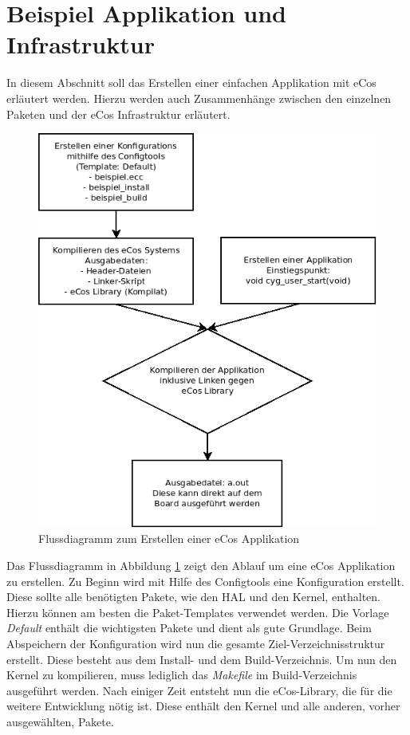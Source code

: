 \documentclass[
  a4paper,					%
  twoside,
  DIV=calc,     				%
  bibliography=totoc,
  cleardoublepage=empty,
  ngerman,     					%
  final       					%
]{scrbook}
\begin{document}
\section{Beispiel Applikation und Infrastruktur}
\label{sec:beispiel_infra}
In diesem Abschnitt soll das Erstellen einer einfachen Applikation mit eCos erläutert werden. Hierzu werden auch Zusammenhänge zwischen den einzelnen Paketen und der eCos Infrastruktur erläutert.


\begin{figure}
\includegraphics[width=12cm]{beispiel_flowchart}
\caption{Flussdiagramm zum Erstellen einer eCos Applikation}
\label{fig:flowchart}
\end{figure}



Das Flussdiagramm in Abbildung \ref{fig:flowchart} zeigt den Ablauf um eine eCos Applikation zu erstellen. Zu Beginn wird mit Hilfe des Configtools eine Konfiguration erstellt. Diese sollte alle benötigten Pakete, wie den HAL und den Kernel, enthalten. Hierzu können am besten die Paket-Templates verwendet werden. Die Vorlage \emph{Default} enthält die wichtigsten Pakete und dient als gute Grundlage. Beim Abspeichern der Konfiguration wird nun die gesamte Ziel-Verzeichnisstruktur erstellt. Diese besteht aus dem Install- und dem Build-Verzeichnis. Um nun den Kernel zu kompilieren, muss lediglich das \emph{Makefile} im Build-Verzeichnis ausgeführt werden. Nach einiger Zeit entsteht nun die eCos-Library, die für die weitere Entwicklung nötig ist. Diese enthält den Kernel und alle anderen, vorher ausgewählten, Pakete.
\end{document}
